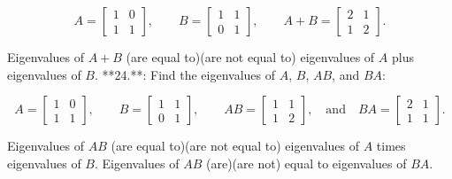 \[A=\begin{bmatrix}1&0\\ 1&1\end{bmatrix},\qquad B=\begin{bmatrix}1&1\\ 0&1\end{bmatrix},\qquad A+B=\begin{bmatrix}2&1\\ 1&2\end{bmatrix}.\]

Eigenvalues of \(A+B\) (are equal to)(are not equal to) eigenvalues of \(A\) plus eigenvalues of \(B\).
**24.**: Find the eigenvalues of \(A\), \(B\), \(AB\), and \(BA\):

\[A=\begin{bmatrix}1&0\\ 1&1\end{bmatrix},\qquad B=\begin{bmatrix}1&1\\ 0&1\end{bmatrix},\qquad AB=\begin{bmatrix}1&1\\ 1&2\end{bmatrix},\quad\text{and}\quad BA=\begin{bmatrix}2&1\\ 1&1\end{bmatrix}.\]

Eigenvalues of \(AB\) (are equal to)(are not equal to) eigenvalues of \(A\) times eigenvalues of \(B\). Eigenvalues of \(AB\) (are)(are not) equal to eigenvalues of \(BA\).

